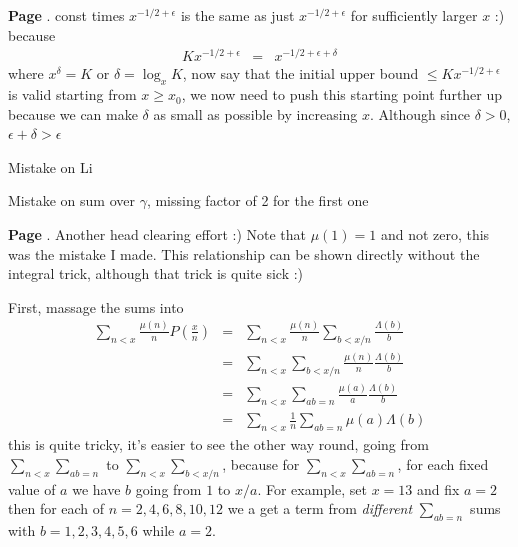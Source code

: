 \documentclass[aps,preprint,preprintnumbers,nofootinbib,showpacs,prd]{revtex4-1}
\newcommand{\nbea}{\begin{eqnarray*}}
\newcommand{\neea}{\end{eqnarray*}}
\begin{document}
{\bf Page }. const times $x^{-1/2 + \epsilon}$ is the same as just $x^{-1/2 + \epsilon}$ for sufficiently larger $x$ :) because
%
\nbea
K x^{-1/2 + \epsilon} & = & x^{-1/2 + \epsilon + \delta}
\neea
%
where $x^\delta = K$ or $\delta = \log_x K$, now say that the initial upper bound $\le K x^{-1/2 + \epsilon}$ is valid starting from $x \ge x_0$, we now need to push this starting point further up because we can make $\delta$ as small as possible by increasing $x$. Although since $\delta > 0$, $\epsilon + \delta > \epsilon$ 











Mistake on Li

Mistake on sum over $\gamma$, missing factor of 2 for the first one
































{\bf Page }. Another head clearing effort :)  Note that $\mu(1) = 1$ and not zero, this was the mistake I made. This relationship can be shown directly without the integral trick, although that trick is quite sick :)

First, massage the sums into
%
\nbea
\sum_{n < x} \frac{\mu(n)}{n} P\left(\frac{x}{n}\right) & = & \sum_{n<x}\frac{\mu(n)}{n} \sum_{b<x/n}\frac{\Lambda(b)}{b} \\
& = & \sum_{n<x}\sum_{b<x/n} \frac{\mu(n)}{n} \frac{\Lambda(b)}{b} \\
& = & \sum_{n<x}\sum_{ab=n} \frac{\mu(a)}{a} \frac{\Lambda(b)}{b} \\
& = & \sum_{n<x}\frac{1}{n}\sum_{ab=n} \mu(a) \Lambda(b)
\neea
%
this is quite tricky, it's easier to see the other way round, going from $\sum_{n<x}\sum_{ab=n}$ to $\sum_{n<x}\sum_{b<x/n}$, because for $\sum_{n<x}\sum_{ab=n}$, for each fixed value of $a$ we have $b$ going from $1$ to $x/a$. For example, set $x=13$ and fix $a = 2$ then for each of $n = 2, 4, 6, 8, 10, 12$ we a get a term from {\it different} $\sum_{ab = n}$ sums with $b = 1, 2, 3, 4, 5, 6$ while $a = 2$.
\end{document}
